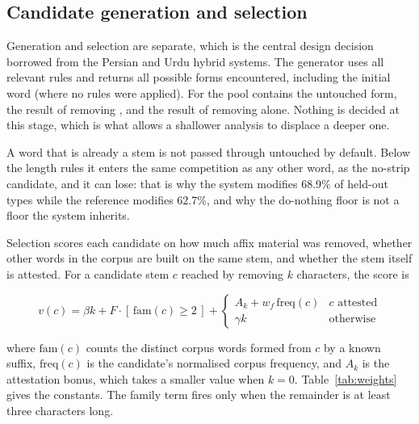 \documentclass[conference]{IEEEtran}
\newcommand{\ps}[1]{{\pashtofont\textpashto{#1}}}
\begin{document}
\subsection{Candidate generation and selection}

Generation and selection are separate, which is the central design decision
borrowed from the Persian and Urdu hybrid systems. The generator uses all
relevant rules and returns all possible forms encountered, including the
initial word (where no rules were applied). For \ps{کورونو} the pool contains the untouched
form, the result of removing \ps{ونو}, and the result of removing \ps{و}
alone. Nothing is decided at this stage, which is what allows a shallower
analysis to displace a deeper one.

A word that is already a stem is not passed through untouched by default. Below
the length rules it enters the same competition as any other word, as the
no-strip candidate, and it can lose: that is why the system modifies 68.9\% of
held-out types while the reference modifies 62.7\%, and why the
do-nothing floor is not a floor the system inherits.

Selection scores each candidate on how much affix material was removed,
whether other words in the corpus are built on the same stem, and whether the
stem itself is attested. For a candidate stem $c$ reached by removing $k$
characters, the score is

\begin{equation*}
v(c) = \beta k + F\!\cdot\![\,\mathrm{fam}(c) \ge 2\,] +
\begin{cases}
A_k + w_f\,\mathrm{freq}(c) & c \text{ attested}\\[2pt]
\gamma k & \text{otherwise}
\end{cases}
\end{equation*}

where $\mathrm{fam}(c)$ counts the distinct corpus words formed from $c$ by a
known suffix, $\mathrm{freq}(c)$ is the candidate's normalised corpus
frequency, and $A_k$ is the attestation bonus, which takes a smaller value when
$k=0$. Table~\ref{tab:weights} gives the constants. The family term fires only
when the remainder is at least three characters long.
\end{document}
